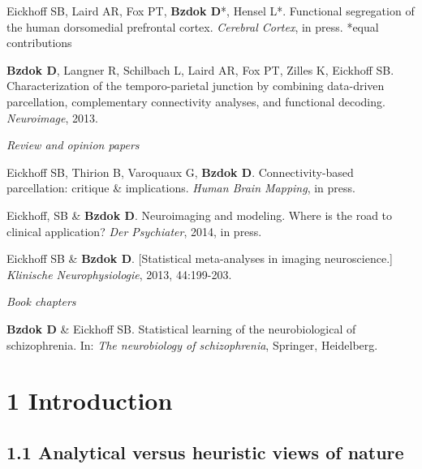 \documentclass[authoryear,review,3p]{elsarticle}
\begin{document}
Eickhoff SB, Laird AR, Fox PT, \textbf{Bzdok D}*, Hensel L*.
Functional segregation of the human dorsomedial prefrontal cortex.
\textit{Cerebral Cortex}, in press. *equal contributions

\textbf{Bzdok D}, Langner R, Schilbach L, Laird AR, Fox PT, Zilles K, Eickhoff SB.
Characterization of the temporo-parietal junction by combining data-driven
parcellation, complementary connectivity analyses, and functional decoding.
\textit{Neuroimage}, 2013.

\bigskip
\textit{Review and opinion papers}

Eickhoff SB, Thirion B, Varoquaux G, \textbf{Bzdok D}.
Connectivity-based parcellation: critique \& implications.
\textit{Human Brain Mapping}, in press.

Eickhoff, SB \& \textbf{Bzdok D}.
Neuroimaging and modeling. Where is the road to clinical application?
\textit{Der Psychiater}, 2014, in press. 

Eickhoff SB \& \textbf{Bzdok D}.
[Statistical meta-analyses in imaging neuroscience.]
\textit{Klinische Neurophysiologie}, 2013, 44:199-203.

\bigskip
\textit{Book chapters}

\linebreak
\textbf{Bzdok D} \& Eickhoff SB.
Statistical learning of the neurobiological of schizophrenia.
In: \textit{The neurobiology of schizophrenia}, Springer, Heidelberg.

\newpage

\section*{1 Introduction}

\subsection*{1.1 Analytical versus heuristic views of nature}
\end{document}
